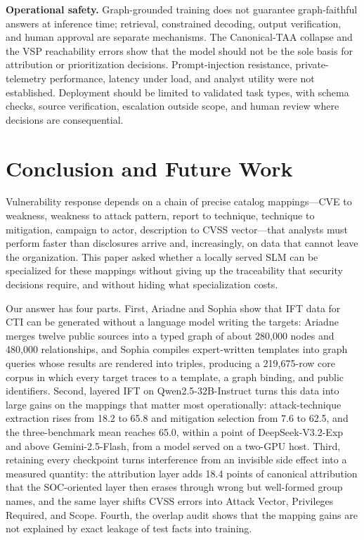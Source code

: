 \documentclass[conference]{IEEEtran}
\begin{document}
\textbf{Operational safety.} Graph-grounded training does not guarantee graph-faithful answers at inference time; retrieval, constrained decoding, output verification, and human approval are separate mechanisms. The Canonical-TAA collapse and the VSP reachability errors show that the model should not be the sole basis for attribution or prioritization decisions. Prompt-injection resistance, private-telemetry performance, latency under load, and analyst utility were not established. Deployment should be limited to validated task types, with schema checks, source verification, escalation outside scope, and human review where decisions are consequential.

\section{Conclusion and Future Work}
Vulnerability response depends on a chain of precise catalog mappings---CVE to weakness, weakness to attack pattern, report to technique, technique to mitigation, campaign to actor, description to CVSS vector---that analysts must perform faster than disclosures arrive and, increasingly, on data that cannot leave the organization. This paper asked whether a locally served SLM can be specialized for these mappings without giving up the traceability that security decisions require, and without hiding what specialization costs.

Our answer has four parts. First, Ariadne and Sophia show that IFT data for CTI can be generated without a language model writing the targets: Ariadne merges twelve public sources into a typed graph of about 280,000 nodes and 480,000 relationships, and Sophia compiles expert-written templates into graph queries whose results are rendered into triples, producing a 219,675-row core corpus in which every target traces to a template, a graph binding, and public identifiers. Second, layered IFT on Qwen2.5-32B-Instruct turns this data into large gains on the mappings that matter most operationally: attack-technique extraction rises from 18.2 to 65.8 and mitigation selection from 7.6 to 62.5, and the three-benchmark mean reaches 65.0, within a point of DeepSeek-V3.2-Exp and above Gemini-2.5-Flash, from a model served on a two-GPU host. Third, retaining every checkpoint turns interference from an invisible side effect into a measured quantity: the attribution layer adds 18.4 points of canonical attribution that the SOC-oriented layer then erases through wrong but well-formed group names, and the same layer shifts CVSS errors into Attack Vector, Privileges Required, and Scope. Fourth, the overlap audit shows that the mapping gains are not explained by exact leakage of test facts into training.
\end{document}
